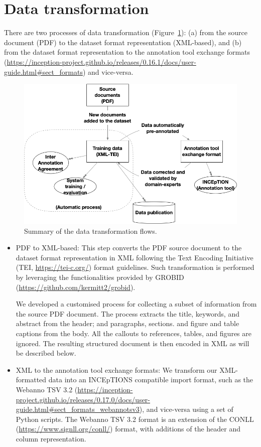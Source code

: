 \section{Data transformation}
\label{subsec:transformation-of-data}
There are two processes of data transformation (Figure~\ref{fig:data-transformation}): (a) from the source document (PDF) to the dataset format representation (XML-based), and (b) from the dataset format representation to the annotation tool exchange formats (\url{https://inception-project.github.io/releases/0.16.1/docs/user-guide.html\#sect_formats}) and vice-versa. 

\begin{figure}[htbp]
    \centering
    \includegraphics[width=\linewidth]{figures/supermat/Fig3.png}
    \caption{Summary of the data transformation flows.}
    \label{fig:data-transformation}
\end{figure}

\begin{itemize}
    \item PDF to XML-based: This step converts the PDF source document to the dataset format representation in XML following the Text Encoding Initiative (TEI, \url{https://tei-c.org/}) format guidelines. 
    Such transformation is performed by leveraging the functionalities provided by GROBID (\url{https://github.com/kermitt2/grobid}).
    
    We developed a customised process for collecting a subset of information from the source PDF document.
    The process extracts the title, keywords, and abstract from the header; and paragraphs, sections. and figure and table captions from the body.
    All the callouts to references, tables, and figures are ignored.
    The resulting structured document is then encoded in XML as will be described below. 
    \item XML to the annotation tool exchange formats: We transform our XML-formatted data into an INCEpTIONS compatible import format, such as the Webanno TSV 3.2 (\url{https://inception-project.github.io/releases/0.17.0/docs/user-guide.html\#sect_formats_webannotsv3}), and vice-versa using a set of Python scripts. 
    The Webanno TSV 3.2 format is an extension of the CONLL (\url{https://www.signll.org/conll/}) format, with additions of the header and column representation.
\end{itemize}

